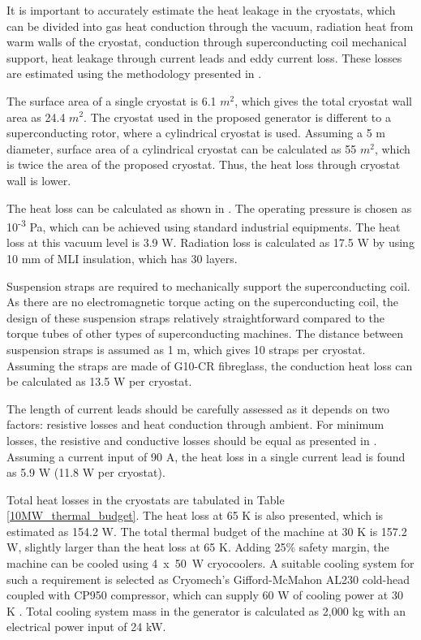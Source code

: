 \documentclass[12pt]{iopart}
\begin{document}
It is important to accurately estimate the heat leakage in the cryostats, which can be divided into gas heat conduction through the vacuum, radiation heat from  warm walls of the cryostat, conduction through superconducting coil mechanical support, heat leakage through current leads and eddy current loss. These losses are estimated using the methodology presented in \cite{Abrahamsen2012, Simons2013}. 


The surface area of a single cryostat is 6.1 $m^2$, which gives the total cryostat wall area as 24.4 $m^2$. The cryostat used in the proposed generator is different to a superconducting rotor, where a cylindrical cryostat is used. Assuming a 5 m diameter, surface area of a cylindrical cryostat can be calculated as 55 $m^2$, which is twice the area of the proposed cryostat. Thus, the heat loss through cryostat wall is lower.

The heat loss can be calculated as shown in \cite{Ekin206}. The operating pressure is chosen as 10\textsuperscript{-3} Pa, which can be achieved using standard industrial equipments. The heat loss at this vacuum level is 3.9 W. Radiation loss is calculated as 17.5 W by using 10 mm of MLI insulation, which has 30 layers.

Suspension straps are required to mechanically support the superconducting coil. As there are no electromagnetic torque acting on the superconducting coil, the design of these suspension straps relatively straightforward compared to the torque tubes of other types of superconducting machines. The distance between suspension straps is assumed as 1 m, which gives 10 straps per cryostat. Assuming the straps are made of G10-CR fibreglass, the conduction heat loss can be calculated as 13.5 W per cryostat.

The length of current leads should be carefully assessed as it depends on two factors: resistive losses and heat conduction through ambient. For minimum losses, the resistive and conductive losses should be equal as presented in \cite{Kalsi2011a}. Assuming a current input of 90 A, the heat loss in a single current lead is found as 5.9 W (11.8 W per cryostat).

Total heat losses in the cryostats are tabulated in Table \ref{10MW_thermal_budget}. The heat loss at 65 K is also presented, which is estimated as 154.2 W. The total thermal budget of the machine  at 30 K is 157.2 W, slightly larger than the heat loss at 65 K. Adding 25\% safety margin, the machine can be cooled using 4~x~50~W cryocoolers. A suitable cooling system for such a requirement is selected as Cryomech's Gifford-McMahon AL230 cold-head coupled with CP950 compressor, which can supply 60 W of cooling power at 30 K \cite{Cryomech2007}. Total cooling system mass in the generator is calculated as 2,000 kg with an electrical power input of 24 kW.
\end{document}
